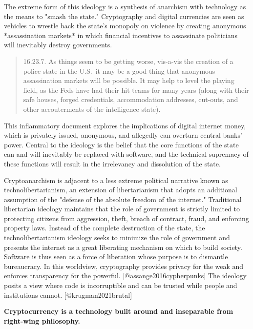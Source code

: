 The extreme form of this ideology is a synthesis of anarchism with technology as
the means to "smash the state." Cryptography and digital currencies are seen as
vehicles to wrestle back the state's monopoly on violence by creating anonymous
*assassination markets* in which financial incentives to assassinate politicians
will inevitably destroy governments.


\begin{quote}
16.23.7. As things seem to be getting worse, vis-a-vis the creation of a
police state in the U.S.--it may be a good thing that anonymous
assassination markets will be possible. It may help to level the playing
field, as the Feds have had their hit teams for many years (along with
their safe houses, forged credentials, accommodation addresses,
cut-outs, and other accouterments of the intelligence state).
\end{quote}

This inflammatory document explores the implications of digital internet money,
which is privately issued, anonymous, and allegedly can overturn central banks'
power. Central to the ideology is the belief that the core functions of the
state can and will inevitably be replaced with software, and the technical
supremacy of these functions will result in the irrelevancy and dissolution of
the state.

Cryptoanarchism is adjacent to a less extreme political narrative known as
technolibertarianism, an extension of libertarianism that adopts an additional
assumption of the "defense of the absolute freedom of the internet." Traditional
libertarian ideology maintains that the role of government is strictly limited
to protecting citizens from aggression, theft, breach of contract, fraud, and
enforcing property laws. Instead of the complete destruction of the state, the
technolibertarianism ideology seeks to minimize the role of government and
presents the internet as a great liberating mechanism on which to build society.
Software is thus seen as a force of liberation whose purpose is to dismantle
bureaucracy. In this worldview, cryptography provides privacy for the weak and
enforces transparency for the powerful. [@assange2016cypherpunks] The ideology
posits a view where code is incorruptible and can be trusted while people and
institutions cannot. [@krugman2021brutal]

\begin{infobox}
 \textbf{
  Cryptocurrency is a technology built around and inseparable from right-wing
  philosophy.
  }
\end{infobox}

